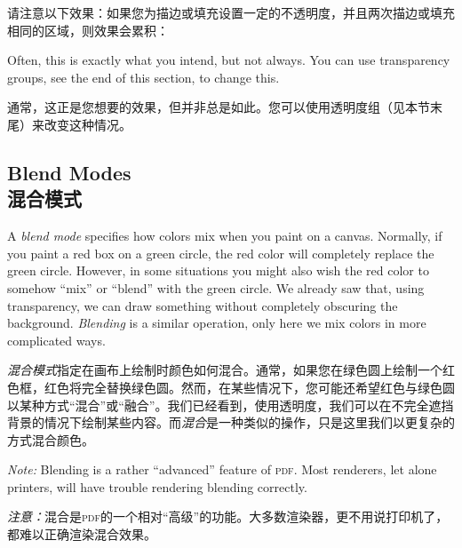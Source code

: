 请注意以下效果：如果您为描边或填充设置一定的不透明度，并且两次描边或填充相同的区域，则效果会累积：


\begin{codeexample}[]
\end{codeexample}

Often, this is exactly what you intend, but not always. You can use
transparency groups, see the end of this section, to change this.

通常，这正是您想要的效果，但并非总是如此。您可以使用透明度组（见本节末尾）来改变这种情况。


\subsection{Blend Modes\\混合模式}
\label{section-blend-modes}

A \emph{blend mode} specifies how colors mix when you paint on a canvas.
Normally, if you paint a red box on a green circle, the red color will
completely replace the green circle. However, in some situations you might also
wish the red color to somehow ``mix'' or ``blend'' with the green circle. We
already saw that, using transparency, we can draw something without completely
obscuring the background. \emph{Blending} is a similar operation, only here we
mix colors in more complicated ways.

\emph{混合模式}指定在画布上绘制时颜色如何混合。通常，如果您在绿色圆上绘制一个红色框，红色将完全替换绿色圆。然而，在某些情况下，您可能还希望红色与绿色圆以某种方式“混合”或“融合”。我们已经看到，使用透明度，我们可以在不完全遮挡背景的情况下绘制某些内容。而\emph{混合}是一种类似的操作，只是这里我们以更复杂的方式混合颜色。

\emph{Note:} Blending is a rather ``advanced'' feature of \textsc{pdf}. Most
renderers, let alone printers, will have trouble rendering blending correctly.

\emph{注意：}混合是\textsc{pdf}的一个相对“高级”的功能。大多数渲染器，更不用说打印机了，都难以正确渲染混合效果。


